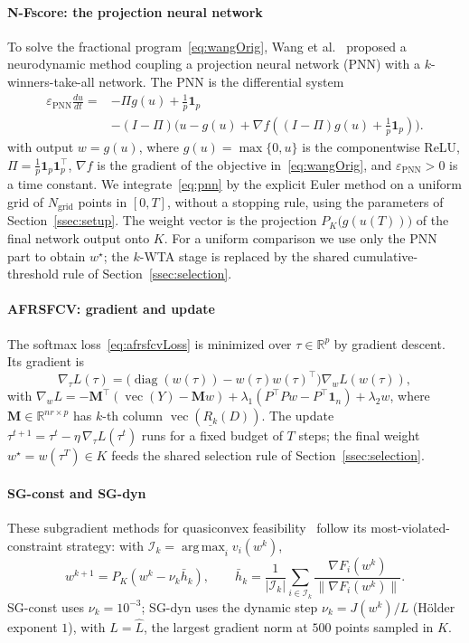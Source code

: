 \documentclass[]{interact}
\theoremstyle{plain}
\theoremstyle{definition}
\theoremstyle{remark}
\newcommand{\R}{\mathbb{R}}
\DeclareMathOperator*{\argmax}{arg\,max}
\DeclareMathOperator{\diag}{diag}
\DeclareMathOperator{\vecop}{vec}
\begin{document}
\paragraph*{N-Fscore: the projection neural network}
To solve the fractional program~\eqref{eq:wangOrig}, Wang et al.~\citep{wang2021fractional} proposed a neurodynamic method coupling a projection neural network (PNN) with a $k$-winners-take-all network. The PNN is the differential system
\begin{equation}\label{eq:pnn}
\begin{split}\varepsilon_{\mathrm{PNN}}\frac{du}{dt}={}&-\Pi g(u)+\tfrac1p\mathbf{1}_p\\&-(I-\Pi)\bigl(u-g(u)+\nabla f((I-\Pi)g(u)+\tfrac1p\mathbf{1}_p)\bigr).\end{split}
\end{equation}
with output $w=g(u)$, where $g(u)=\max\{0,u\}$ is the componentwise ReLU, $\Pi=\tfrac1p\mathbf{1}_p\mathbf{1}_p^{\top}$, $\nabla f$ is the gradient of the objective in~\eqref{eq:wangOrig}, and $\varepsilon_{\mathrm{PNN}}>0$ is a time constant. We integrate~\eqref{eq:pnn} by the explicit Euler method on a uniform grid of $N_{\mathrm{grid}}$ points in $[0,T]$, without a stopping rule, using the parameters of Section~\ref{ssec:setup}. The weight vector is the projection $P_K\bigl(g(u(T))\bigr)$ of the final network output onto $K$. For a uniform comparison we use only the PNN part to obtain $w^\star$; the $k$-WTA stage is replaced by the shared cumulative-threshold rule of Section~\ref{ssec:selection}.

\paragraph*{AFRSFCV: gradient and update}
The softmax loss~\eqref{eq:afrsfcvLoss} is minimized over $\tau\in\R^p$ by gradient descent. Its gradient is
\begin{equation}\label{eq:gradTau}
\nabla_\tau L(\tau)=\bigl(\diag(w(\tau))-w(\tau)w(\tau)^{\top}\bigr)\nabla_w L(w(\tau)),
\end{equation}
with $\nabla_w L=-\mathbf{M}^{\top}(\vecop(Y)-\mathbf{M}w)+\lambda_1(P^{\top}Pw-P^{\top}\mathbf{1}_n)+\lambda_2 w$, where $\mathbf{M}\in\R^{nr\times p}$ has $k$-th column $\vecop(\underline{R_k}(D))$. The update $\tau^{t+1}=\tau^t-\eta\,\nabla_\tau L(\tau^t)$ runs for a fixed budget of $T$ steps; the final weight $w^\star=w(\tau^T)\in K$ feeds the shared selection rule of Section~\ref{ssec:selection}.

\paragraph*{SG-const and SG-dyn}
These subgradient methods for quasiconvex feasibility~\citep{hu2022quasi} follow its
most-violated-constraint strategy: with $\mathcal I_k=\argmax_i v_i(w^k)$,
\[
w^{k+1}=P_K(w^k-\nu_k\bar h_k),\qquad
\bar h_k=\frac1{|\mathcal I_k|}\sum_{i\in\mathcal I_k}\frac{\nabla F_i(w^k)}{\|\nabla F_i(w^k)\|}.
\]
SG-const uses $\nu_k=10^{-3}$; SG-dyn uses the dynamic step $\nu_k=J(w^k)/L$ (H\"older
exponent $1$), with $L=\widehat L$, the largest gradient norm at $500$ points sampled in $K$.
\end{document}
